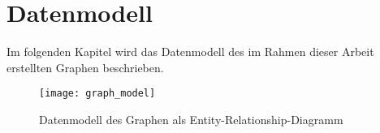 \chapter{Datenmodell}

Im folgenden Kapitel wird das Datenmodell des im Rahmen dieser Arbeit erstellten Graphen beschrieben.

\begin{figure}
\label{fig:graph_model}
\begin{center}
    \texttt{[image: graph\_model]}
\end{center}
\caption{Datenmodell des Graphen als Entity-Relationship-Diagramm}
\end{figure}
